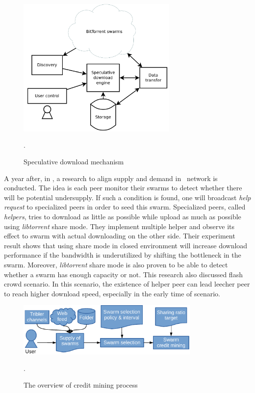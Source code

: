 \begin{figure}[h]
	\centering
	\includegraphics[width=0.7\textwidth]{pics/SDE2013.png}
	\caption{Speculative download mechanism \cite{2013:investmentcm:capota}}.
	\label{fig:sde13}
\end{figure}

A year after, in \citeyear{2014:bwmarket:capota}, a research to align supply and demand in \bt~network is conducted. The idea is each peer monitor their swarms to detect whether there will be potential undersupply. If such a condition is found, one will broadcast \textit{help request} to specialized peers in order to seed this swarm. Specialized peers, called \textit{helpers}, tries to download as little as possible while upload as much as possible using \textit{libtorrent} share mode. They implement multiple helper and observe its effect to swarm with actual downloading on the other side. Their experiment result shows that using share mode in closed environment will increase download performance if the bandwidth is underutilized \cite{2014:bwmarket:capota} by shifting the bottleneck in the swarm. Moreover, \textit{libtorrent} share mode is also proven to be able to detect whether a swarm has enough capacity or not. This research also discussed flash crowd scenario. In this scenario, the existence of helper peer can lead leecher peer to reach higher download speed, especially in the early time of scenario. 
 
\begin{figure}[h]
	\centering
	\includegraphics[width=0.8\textwidth]{pics/creditmining2015.pdf}
	\caption{The overview of credit mining process \cite{2015:creditmining:capota}}.
	\label{fig:cm15}
\end{figure}


